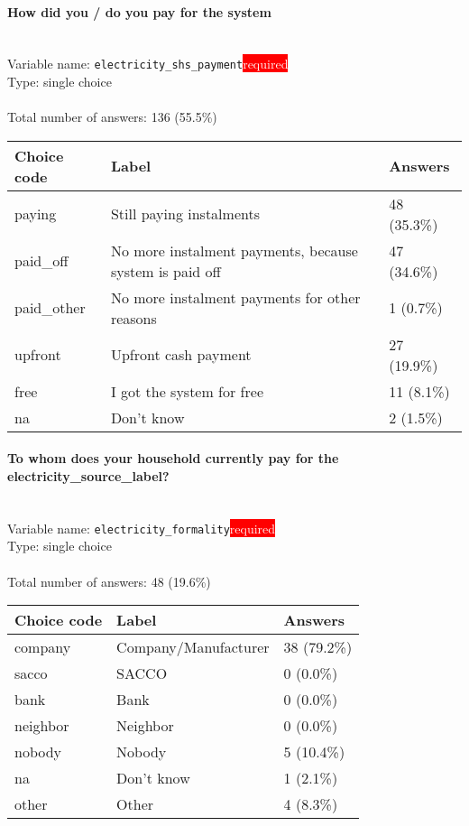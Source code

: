 \documentclass[11.5pt, a4paper]{scrartcl}
\begin{document}
\paragraph{How did you / do you pay for the system}
\  \\Variable name: \texttt{electricity\_shs\_payment}\hfill\colorbox{red}{\small{\textcolor{white}{required}}}\\
 Type: single choice\\
\\Total number of answers: 136 (55.5\%)
\\[0.2em] \begin{tabular}{p{4cm}|p{8cm}|p{3cm}}
Choice code & Label & Answers \\
\hline
paying & Still paying instalments& \cellcolor{color1}48 (35.3\%)\\
\cellcolor{mygray} paid\_off & \cellcolor{mygray}No more instalment payments, because system is paid off & \cellcolor{color1}47 (34.6\%)\\
paid\_other & No more instalment payments for other reasons& \cellcolor{color0}1 (0.7\%)\\
\cellcolor{mygray} upfront & \cellcolor{mygray}Upfront cash payment & \cellcolor{color0}27 (19.9\%)\\
free & I got the system for free& \cellcolor{color0}11 (8.1\%)\\
\cellcolor{mygray} na & \cellcolor{mygray}Don't know & \cellcolor{color0}2 (1.5\%)\\
\end{tabular}
\paragraph{To whom does your household currently pay for the electricity\_source\_label?}
\  \\Variable name: \texttt{electricity\_formality}\hfill\colorbox{red}{\small{\textcolor{white}{required}}}\\
 Type: single choice\\
\\Total number of answers: 48 (19.6\%)
\\[0.2em] \begin{tabular}{p{4cm}|p{8cm}|p{3cm}}
Choice code & Label & Answers \\
\hline
company & Company/Manufacturer& \cellcolor{color3}38 (79.2\%)\\
\cellcolor{mygray} sacco & \cellcolor{mygray}SACCO & \cellcolor{color0}0 (0.0\%)\\
bank & Bank& \cellcolor{color0}0 (0.0\%)\\
\cellcolor{mygray} neighbor & \cellcolor{mygray}Neighbor & \cellcolor{color0}0 (0.0\%)\\
nobody & Nobody& \cellcolor{color0}5 (10.4\%)\\
\cellcolor{mygray} na & \cellcolor{mygray}Don't know & \cellcolor{color0}1 (2.1\%)\\
other & Other& \cellcolor{color0}4 (8.3\%)\\
\end{tabular}
\end{document}
